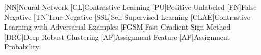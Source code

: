 \begin{acronym}

    [NN]{Neural Network}
    [CL]{Contrastive Learning}
    [PU]{Positive-Unlabeled}
    [FN]{False Negative}
    [TN]{True Negative}
    [SSL]{Self-Supervised Learning}
    [CLAE]{Contrastive Learning with Adversarial Examples}
    [FGSM]{Fast Gradient Sign Method}
    [DRC]{Deep Robust Clustering}
    [AF]{Assignment Feature}
    [AP]{Assignment Probability}


\end{acronym}